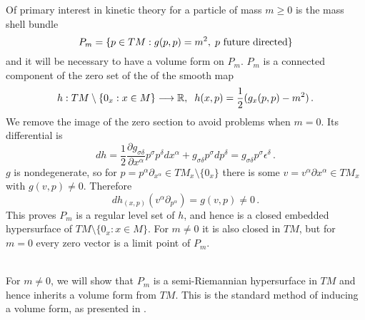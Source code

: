 Of primary interest in kinetic theory for a particle of mass $m\geq 0$ is the mass shell bundle
\begin{equation}
P_m=\{p\in TM :g(p,p)=m^2,\hspace{1mm}  p\text{ future directed}\}
\end{equation}
and it will be necessary to have a volume form on $P_m$.  $P_m$ is a connected component of the zero set of the of the smooth map 
\begin{equation}\label{definingFunction}
h:TM\setminus \{0_x:x\in M\}\longrightarrow \mathbb{R},\hspace{2mm} h(x,p)= \frac{1}{2}(g_x(p,p)-m^2)\,.  
\end{equation} 
We remove the image of the zero section to avoid problems when $m=0$.  Its differential is
\begin{equation}\label{dh}
dh=\frac{1}{2}\frac{\partial g_{\sigma\delta}}{\partial x^\alpha}p^\sigma p^\delta dx^\alpha+g_{\sigma\delta}p^\sigma dp^\delta=g_{\sigma\delta}p^\sigma\epsilon^\delta\,.
\end{equation}
$g$ is nondegenerate, so for $p=p^{\alpha}\partial_{x^\alpha}\in TM_x\setminus{\{0_x\}}$ there is some $v=v^\alpha\partial{x^\alpha}\in TM_x$ with $g(v,p)\neq 0$.  Therefore
\begin{equation}
dh_{(x,p)}(v^\alpha\partial_{p^\alpha})=g(v,p)\neq 0\,.
\end{equation}
This proves $P_m$ is a regular level set of $h$, and hence is a closed embedded hypersurface of $TM\setminus \{0_x:x\in M\}$.  For $m\neq 0$ it is also closed in $TM$, but for $m=0$ every zero vector is a limit point of $P_m$.

\\
For $m\neq 0$, we will show that $P_m$ is a semi-Riemannian hypersurface in $TM$ and hence inherits a volume form from $TM$. This is the standard method of inducing a volume form, as presented in \cite{tsamparlis}.  

